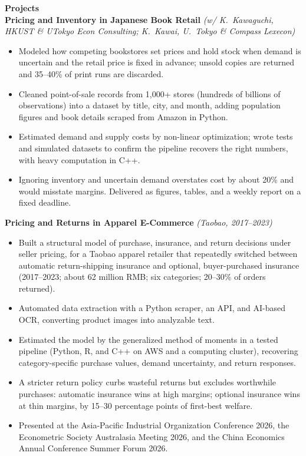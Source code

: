 \documentclass[11pt,letterpaper]{article}
\begin{document}
{\large \textbf{Projects}}\\[1pt]
\textbf{Pricing and Inventory in Japanese Book Retail} \textit{(w/ K.\ Kawaguchi, HKUST \& UTokyo Econ Consulting; K.\ Kawai, U.\ Tokyo \& Compass Lexecon)}\\
\vspace{1pt}
\begin{itemize}
  \item Modeled how competing bookstores set prices and hold stock when demand is uncertain and the retail price is fixed in advance; unsold copies are returned and 35--40\% of print runs are discarded.
  \item Cleaned point-of-sale records from 1{,}000+ stores (hundreds of billions of observations) into a dataset by title, city, and month, adding population figures and book details scraped from Amazon in Python.
  \item Estimated demand and supply costs by non-linear optimization; wrote tests and simulated datasets to confirm the pipeline recovers the right numbers, with heavy computation in C++.
  \item Ignoring inventory and uncertain demand overstates cost by about 20\% and would misstate margins. Delivered as figures, tables, and a weekly report on a fixed deadline.
\end{itemize}
\vspace{1pt}
\textbf{Pricing and Returns in Apparel E-Commerce} \textit{(Taobao, 2017--2023)}\\
\vspace{1pt}
\begin{itemize}
  \item Built a structural model of purchase, insurance, and return decisions under seller pricing, for a Taobao apparel retailer that repeatedly switched between automatic return-shipping insurance and optional, buyer-purchased insurance (2017--2023; about 62 million RMB; six categories; 20--30\% of orders returned).
  \item Automated data extraction with a Python scraper, an API, and AI-based OCR, converting product images into analyzable text.
  \item Estimated the model by the generalized method of moments in a tested pipeline (Python, R, and C++ on AWS and a computing cluster), recovering category-specific purchase values, demand uncertainty, and return responses.
  \item A stricter return policy curbs wasteful returns but excludes worthwhile purchases: automatic insurance wins at high margins; optional insurance wins at thin margins, by 15--30 percentage points of first-best welfare.
  \item Presented at the Asia-Pacific Industrial Organization Conference 2026, the Econometric Society Australasia Meeting 2026, and the China Economics Annual Conference Summer Forum 2026.
\end{itemize}
\end{document}
